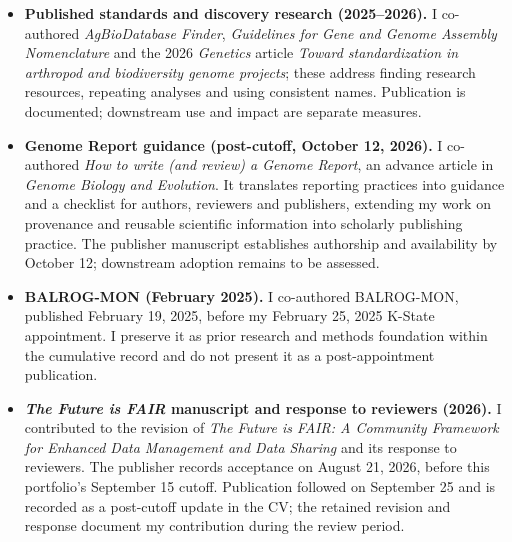 \begin{itemize}
\item \textbf{Published standards and discovery research (2025--2026).} I co-authored \textit{AgBioDatabase Finder}, \textit{Guidelines for Gene and Genome Assembly Nomenclature} and the 2026 \textit{Genetics} article \textit{Toward standardization in arthropod and biodiversity genome projects}; these address finding research resources, repeating analyses and using consistent names. Publication is documented; downstream use and impact are separate measures.
\item \textbf{Genome Report guidance (post-cutoff, October 12, 2026).}\label{update-genomereport} I co-authored \textit{How to write (and review) a Genome Report}, an advance article in \textit{Genome Biology and Evolution}. It translates reporting practices into guidance and a checklist for authors, reviewers and publishers, extending my work on provenance and reusable scientific information into scholarly publishing practice. The publisher manuscript establishes authorship and availability by October 12; downstream adoption remains to be assessed.
\item \textbf{BALROG-MON (February 2025).} I co-authored BALROG-MON, published February 19, 2025, before my February 25, 2025 K-State appointment. I preserve it as prior research and methods foundation within the cumulative record and do not present it as a post-appointment publication.
\item \textbf{\textit{The Future is FAIR} manuscript and response to reviewers (2026).} I contributed to the revision of \textit{The Future is FAIR: A Community Framework for Enhanced Data Management and Data Sharing} and its response to reviewers. The publisher records acceptance on August 21, 2026, before this portfolio's September 15 cutoff. Publication followed on September 25 and is recorded as a post-cutoff update in the CV; the retained revision and response document my contribution during the review period.

\end{itemize}
